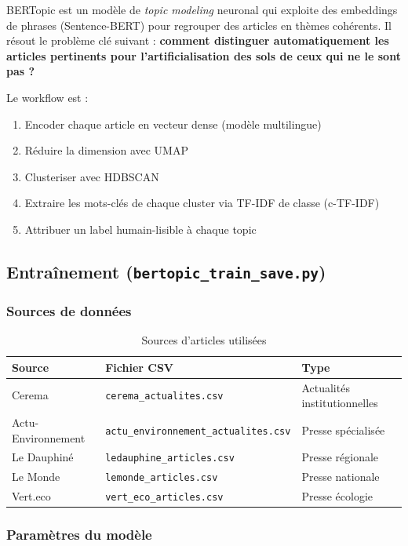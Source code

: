 \documentclass[12pt,a4paper]{report}
\newcommand{\code}[1]{\texttt{\small #1}}
\begin{document}
BERTopic est un modèle de \textit{topic modeling} neuronal qui exploite des embeddings de phrases (Sentence-BERT) pour regrouper des articles en thèmes cohérents. Il résout le problème clé suivant : \textbf{comment distinguer automatiquement les articles pertinents pour l'artificialisation des sols de ceux qui ne le sont pas ?}

Le workflow est :
\begin{enumerate}
  \item Encoder chaque article en vecteur dense (modèle multilingue)
  \item Réduire la dimension avec UMAP
  \item Clusteriser avec HDBSCAN
  \item Extraire les mots-clés de chaque cluster via TF-IDF de classe (c-TF-IDF)
  \item Attribuer un label humain-lisible à chaque topic
\end{enumerate}

\subsection{Entraînement (\code{bertopic\_train\_save.py})}

\subsubsection{Sources de données}

\begin{table}[H]
\centering
\begin{tabular}{lll}
\toprule
\textbf{Source} & \textbf{Fichier CSV} & \textbf{Type} \\
\midrule
Cerema & \code{cerema\_actualites.csv} & Actualités institutionnelles \\
Actu-Environnement & \code{actu\_environnement\_actualites.csv} & Presse spécialisée \\
Le Dauphiné & \code{ledauphine\_articles.csv} & Presse régionale \\
Le Monde & \code{lemonde\_articles.csv} & Presse nationale \\
Vert.eco & \code{vert\_eco\_articles.csv} & Presse écologie \\
\bottomrule
\end{tabular}
\caption{Sources d'articles utilisées}
\end{table}

\subsubsection{Paramètres du modèle}
\end{document}
